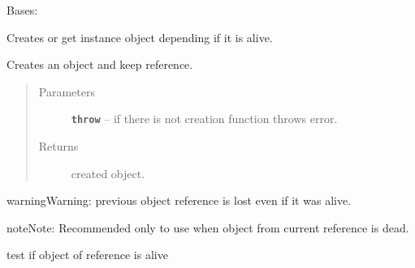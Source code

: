 \documentclass[letterpaper,10pt,english]{sphinxmanual}
\begin{document}
\begin{fulllineitems}
\label{RRtoolbox.lib:RRtoolbox.lib.cache.ObjectGetter}
Bases: 

Creates or get instance object depending if it is alive.

\begin{fulllineitems}
\label{RRtoolbox.lib:RRtoolbox.lib.cache.ObjectGetter.create}
Creates an object and keep reference.
\begin{quote}\begin{description}
\item[{Parameters}] \leavevmode
\textbf{\texttt{throw}} -- if there is not creation function throws error.

\item[{Returns}] \leavevmode
created object.

\end{description}\end{quote}

\begin{notice}{warning}{Warning:}
previous object reference is lost even if it was alive.
\end{notice}

\begin{notice}{note}{Note:}
Recommended only to use when object from current reference is dead.
\end{notice}

\end{fulllineitems}


\begin{fulllineitems}
\label{RRtoolbox.lib:RRtoolbox.lib.cache.ObjectGetter.getObj}
\end{fulllineitems}


\begin{fulllineitems}
\label{RRtoolbox.lib:RRtoolbox.lib.cache.ObjectGetter.isAlive}
test if object of reference is alive


\end{fulllineitems}
\end{fulllineitems}
\end{document}
